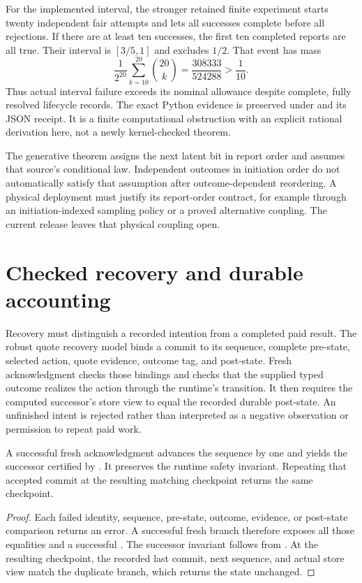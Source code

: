For the implemented interval, the stronger retained finite experiment starts
twenty independent fair attempts and lets all successes complete before all
rejections. If there are at least ten successes, the first ten completed reports
are all true. Their interval is $[3/5,1]$ and excludes $1/2$. That event has mass
\[
 \frac{1}{2^{20}}\sum_{k=10}^{20}\binom{20}{k}
 =\frac{308333}{524288}>\frac{1}{10}.
\]
Thus actual interval failure exceeds its nominal allowance despite complete,
fully resolved lifecycle records. The exact Python evidence is preserved under
 and its JSON receipt. It is
a finite computational obstruction with an explicit rational derivation here,
not a newly kernel-checked theorem.

The generative theorem assigns the next latent bit in report order and assumes
that source's conditional law. Independent outcomes in initiation order do not
automatically satisfy that assumption after outcome-dependent reordering. A
physical deployment must justify its report-order contract, for example through
an initiation-indexed sampling policy or a proved alternative coupling. The
current release leaves that physical coupling open.

\section{Checked recovery and durable accounting}
\label{sec:recovery}

Recovery must distinguish a recorded intention from a completed paid result.
The robust quote recovery model binds a commit to its sequence, complete
pre-state, selected action, quote evidence, outcome tag, and post-state. Fresh
acknowledgment checks those bindings and checks that the supplied typed outcome
realizes the action through the runtime's  transition. It then
requires the computed successor's store view to equal the recorded durable
post-state. An unfinished intent is rejected rather than interpreted as a
negative observation or permission to repeat paid work.

\begin{proposition}
A successful fresh acknowledgment advances the sequence by one and yields
the successor certified by . It preserves the runtime safety
invariant. Repeating that accepted commit at the resulting matching checkpoint
returns the same checkpoint.
\end{proposition}
\begin{proof}
Each failed identity, sequence, pre-state, outcome, evidence, or post-state
comparison returns an error. A successful fresh branch therefore exposes all
those equalities and a successful . The successor invariant
follows from . At the resulting checkpoint, the recorded
last commit, next sequence, and actual store view match the duplicate branch,
which returns the state unchanged.
\end{proof}

